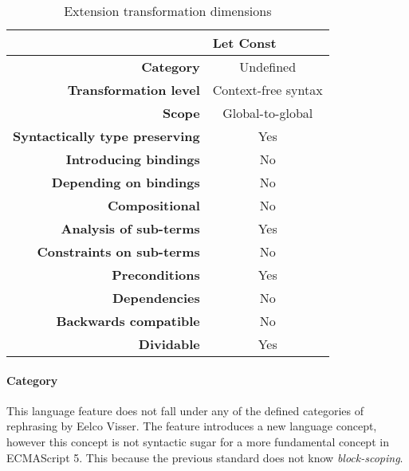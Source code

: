 \documentclass[10pt,a4paper]{article}
\begin{document}
\begin{table}[H]
\centering
\caption{Extension transformation dimensions}
\label{let-const-table}
\begin{tabular}{@{}rc@{}}
\toprule
                                       & \multicolumn{1}{l}{\textbf{Let Const}} \\ \midrule
\textbf{Category}                      & Undefined
\\
\textbf{Transformation level}          & Context-free syntax                          \\
\textbf{Scope}                         & Global-to-global                               \\
\textbf{Syntactically type preserving} & Yes                                          \\
\textbf{Introducing bindings}          & No                                          \\%
\textbf{Depending on bindings}         & No                                           \\
\textbf{Compositional}                 & No                                          \\
\textbf{Analysis of sub-terms}          & Yes                                          \\
\textbf{Constraints on sub-terms}       & No                                           \\
\textbf{Preconditions}                 & Yes                                          \\
\textbf{Dependencies}                  & No                                           \\
\textbf{Backwards compatible}          & No                                          \\
\textbf{Dividable}                     & Yes                                           \\ \bottomrule
\end{tabular}
\end{table}

\paragraph{Category}
This language feature does not fall under any of the defined categories of rephrasing by Eelco Visser\cite{Visser2001}. The feature introduces a new language concept, however this concept is not syntactic sugar for a more fundamental concept in ECMAScript 5. This because the previous standard does not know \textit{block-scoping}.
\end{document}

